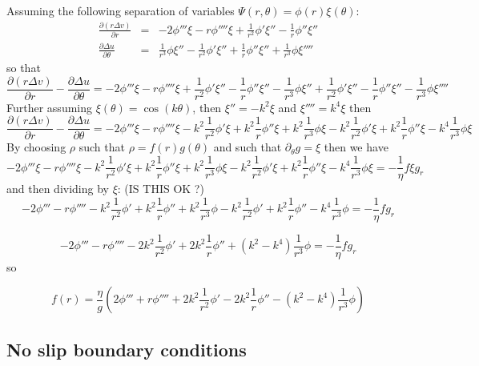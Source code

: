 Assuming the following separation of variables $\boxed{\Psi(r,\theta)=\phi(r)\xi(\theta)}$:
\begin{eqnarray}
\frac{\partial (r  \Delta v)}{\partial r}
&=& -2 \phi''' \xi - r \phi'''' \xi + \frac{1}{r^2} \phi' \xi''  - \frac{1}{r} \phi'' \xi'' \\
\frac{\partial  \Delta u}{\partial \theta}
&=&
\frac{1}{r^3} \phi \xi '' -
\frac{1}{r^2} \phi' \xi'' +
\frac{1}{r} \phi'' \xi'' +
\frac{1}{r^3} \phi \xi''''
\end{eqnarray}
so that 
\[
\frac{\partial (r  \Delta v)}{\partial r} - \frac{\partial  \Delta u}{\partial \theta}
=  -2 \phi''' \xi - r \phi'''' \xi + \frac{1}{r^2} \phi' \xi''  - \frac{1}{r} \phi'' \xi'' 
-\frac{1}{r^3} \phi \xi '' +
\frac{1}{r^2} \phi' \xi'' -
\frac{1}{r} \phi'' \xi'' -
\frac{1}{r^3} \phi \xi''''
\]
Further assuming $\boxed{\xi(\theta)=\cos(k\theta)}$, then $\xi''=-k^2 \xi$ and $\xi''''=k^4 \xi$
then 
\[
\frac{\partial (r  \Delta v)}{\partial r} - \frac{\partial  \Delta u}{\partial \theta}
=  -2 \phi''' \xi - r \phi'''' \xi - k^2 \frac{1}{r^2} \phi' \xi  +k^2 \frac{1}{r} \phi'' \xi 
+ k^2\frac{1}{r^3} \phi \xi  
-k^2\frac{1}{r^2} \phi' \xi 
+k^2 \frac{1}{r} \phi'' \xi 
- k^4\frac{1}{r^3} \phi \xi
\]
By choosing $\rho$ such that $\rho= f(r)g(\theta)$ and such that $\partial_\theta g = \xi$
then we have 
\[
 -2 \phi''' \xi - r \phi'''' \xi - k^2 \frac{1}{r^2} \phi' \xi  +k^2 \frac{1}{r} \phi'' \xi 
+ k^2\frac{1}{r^3} \phi \xi  
-k^2\frac{1}{r^2} \phi' \xi 
+k^2 \frac{1}{r} \phi'' \xi 
- k^4\frac{1}{r^3} \phi \xi
=
- \frac{1}{\eta} f \xi  g_r
\]
and then dividing by $\xi$: (IS THIS OK ?)
\[
 -2 \phi'''  - r \phi''''  - k^2 \frac{1}{r^2} \phi'   +k^2 \frac{1}{r} \phi''  
+ k^2\frac{1}{r^3} \phi 
-k^2\frac{1}{r^2} \phi' 
+k^2 \frac{1}{r} \phi'' 
- k^4\frac{1}{r^3} \phi 
=
- \frac{1}{\eta} f   g_r
\]

\[
-2 \phi'''  - r \phi''''  
- 2k^2 \frac{1}{r^2} \phi'   
+2k^2 \frac{1}{r} \phi''  
+ (k^2-k^4) \frac{1}{r^3} \phi 
=
- \frac{1}{\eta} f   g_r
\]
so 


\[
\boxed{
f(r) = \frac{\eta}{g} \left( 
2 \phi'''  + r \phi''''  + 2k^2 \frac{1}{r^2} \phi'   
-2k^2 \frac{1}{r} \phi''  
- (k^2-k^4) \frac{1}{r^3} \phi 
\right)
}
\]

\subsection{No slip boundary conditions}

